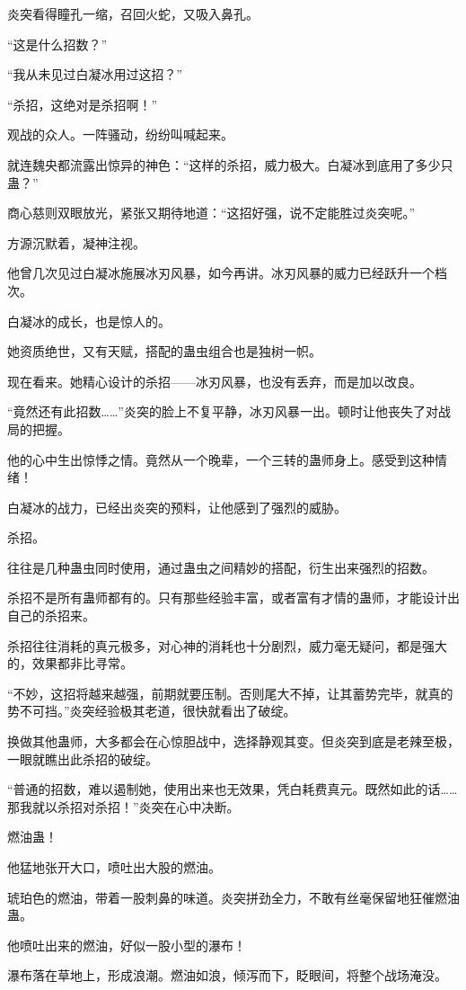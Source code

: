 \begin{this_body}
炎突看得瞳孔一缩，召回火蛇，又吸入鼻孔。

“这是什么招数？”

“我从未见过白凝冰用过这招？”

“杀招，这绝对是杀招啊！”

观战的众人。一阵骚动，纷纷叫喊起来。

就连魏央都流露出惊异的神色：“这样的杀招，威力极大。白凝冰到底用了多少只蛊？”

商心慈则双眼放光，紧张又期待地道：“这招好强，说不定能胜过炎突呢。”

方源沉默着，凝神注视。

他曾几次见过白凝冰施展冰刃风暴，如今再讲。冰刃风暴的威力已经跃升一个档次。

白凝冰的成长，也是惊人的。

她资质绝世，又有天赋，搭配的蛊虫组合也是独树一帜。

现在看来。她精心设计的杀招——冰刃风暴，也没有丢弃，而是加以改良。

“竟然还有此招数……”炎突的脸上不复平静，冰刃风暴一出。顿时让他丧失了对战局的把握。

他的心中生出惊悸之情。竟然从一个晚辈，一个三转的蛊师身上。感受到这种情绪！

白凝冰的战力，已经出炎突的预料，让他感到了强烈的威胁。

杀招。

往往是几种蛊虫同时使用，通过蛊虫之间精妙的搭配，衍生出来强烈的招数。

杀招不是所有蛊师都有的。只有那些经验丰富，或者富有才情的蛊师，才能设计出自己的杀招来。

杀招往往消耗的真元极多，对心神的消耗也十分剧烈，威力毫无疑问，都是强大的，效果都非比寻常。

“不妙，这招将越来越强，前期就要压制。否则尾大不掉，让其蓄势完毕，就真的势不可挡。”炎突经验极其老道，很快就看出了破绽。

换做其他蛊师，大多都会在心惊胆战中，选择静观其变。但炎突到底是老辣至极，一眼就瞧出此杀招的破绽。

“普通的招数，难以遏制她，使用出来也无效果，凭白耗费真元。既然如此的话……那我就以杀招对杀招！”炎突在心中决断。

燃油蛊！

他猛地张开大口，喷吐出大股的燃油。

琥珀色的燃油，带着一股刺鼻的味道。炎突拼劲全力，不敢有丝毫保留地狂催燃油蛊。

他喷吐出来的燃油，好似一股小型的瀑布！

瀑布落在草地上，形成浪潮。燃油如浪，倾泻而下，眨眼间，将整个战场淹没。


\end{this_body}
